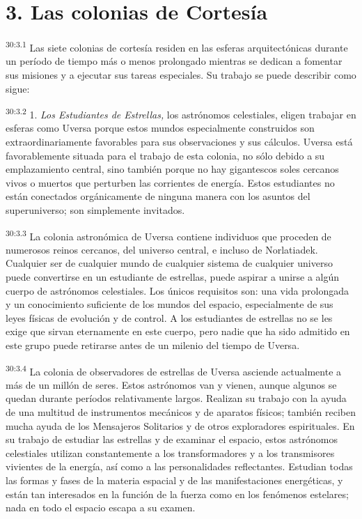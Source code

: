 \section*{3. Las colonias de Cortesía}
\par
\textsuperscript{30:3.1} Las siete colonias de cortesía residen en las esferas arquitectónicas durante un período de tiempo más o menos prolongado mientras se dedican a fomentar sus misiones y a ejecutar sus tareas especiales. Su trabajo se puede describir como sigue:

\par
\textsuperscript{30:3.2} 1. \textit{Los Estudiantes de Estrellas,} los astrónomos celestiales, eligen trabajar en esferas como Uversa porque estos mundos especialmente construidos son extraordinariamente favorables para sus observaciones y sus cálculos. Uversa está favorablemente situada para el trabajo de esta colonia, no sólo debido a su emplazamiento central, sino también porque no hay gigantescos soles cercanos vivos o muertos que perturben las corrientes de energía. Estos estudiantes no están conectados orgánicamente de ninguna manera con los asuntos del superuniverso; son simplemente invitados.

\par
\textsuperscript{30:3.3} La colonia astronómica de Uversa contiene individuos que proceden de numerosos reinos cercanos, del universo central, e incluso de Norlatiadek. Cualquier ser de cualquier mundo de cualquier sistema de cualquier universo puede convertirse en un estudiante de estrellas, puede aspirar a unirse a algún cuerpo de astrónomos celestiales. Los únicos requisitos son: una vida prolongada y un conocimiento suficiente de los mundos del espacio, especialmente de sus leyes físicas de evolución y de control. A los estudiantes de estrellas no se les exige que sirvan eternamente en este cuerpo, pero nadie que ha sido admitido en este grupo puede retirarse antes de un milenio del tiempo de Uversa.

\par
\textsuperscript{30:3.4} La colonia de observadores de estrellas de Uversa asciende actualmente a más de un millón de seres. Estos astrónomos van y vienen, aunque algunos se quedan durante períodos relativamente largos. Realizan su trabajo con la ayuda de una multitud de instrumentos mecánicos y de aparatos físicos; también reciben mucha ayuda de los Mensajeros Solitarios y de otros exploradores espirituales. En su trabajo de estudiar las estrellas y de examinar el espacio, estos astrónomos celestiales utilizan constantemente a los transformadores y a los transmisores vivientes de la energía, así como a las personalidades reflectantes. Estudian todas las formas y fases de la materia espacial y de las manifestaciones energéticas, y están tan interesados en la función de la fuerza como en los fenómenos estelares; nada en todo el espacio escapa a su examen.

